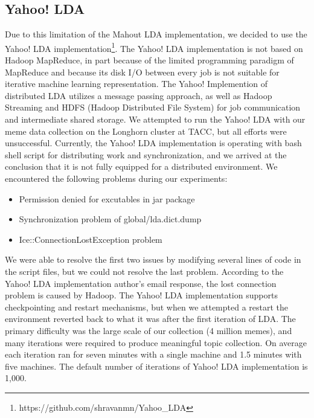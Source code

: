 \documentclass{sig-alternate}
\begin{document}
\subsection{Yahoo! LDA}
Due to this limitation of the Mahout LDA implementation, we decided to use the Yahoo! LDA implementation\footnote{https://github.com/shravanmn/Yahoo\_LDA}. The Yahoo! LDA implementation is not based on Hadoop MapReduce, in part because of the limited programming paradigm of MapReduce and because its disk I/O between every job is not suitable for iterative machine learning representation. The Yahoo! Implemention of distributed LDA utilizes a message passing approach, as well as  Hadoop Streaming and HDFS (Hadoop Distributed File System) for job communication and intermediate shared storage. We attempted to run the Yahoo! LDA with our meme data collection on the Longhorn cluster at TACC, but all efforts were unsuccessful. Currently, the Yahoo! LDA implementation is operating with bash shell script for distributing work and synchronization, and we arrived at the conclusion that it is not fully equipped for a distributed environment. We encountered the following problems during our experiments:
\begin{itemize}
 \item Permission denied for excutables in jar package
 \item Synchronization problem of global/lda.dict.dump
 \item Ice::ConnectionLostException problem 
\end{itemize}
We were able to resolve the first two issues by modifying several lines of code in the script files, but we could not resolve the last problem. According to the Yahoo! LDA implementation author's email response, the lost connection problem is caused by Hadoop. The Yahoo! LDA implementation supports checkpointing and restart mechanisms, but when we attempted a restart the environment reverted back to what it was after the first iteration of LDA. The primary difficulty was the large scale of our collection (4 million memes), and many iterations were required to produce meaningful topic collection. On average each iteration ran for seven minutes with a single machine and 1.5 minutes with five machines. The default number of iterations of Yahoo! LDA implementation is 1,000.
\end{document}
